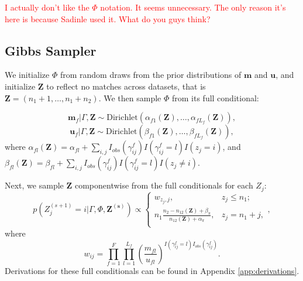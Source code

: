 \documentclass[ba]{imsart}
\begin{document}
\textcolor{red}{I actually don't like the $\Phi$ notation. It seems unnecessary. The only reason it's here is because Sadinle used it. What do you guys think?}

\hypertarget{posterior-sampling}{%
	\subsection{Gibbs Sampler}
	\label{gibbs_sampling}}

We initialize $\Phi$ from random draws from the prior distributions of $\bm{m}$ and $\bm{u}$, and initialize $\bm{Z}$ to reflect no matches across datasets, that is $\bm{Z} = (n_1 + 1, \ldots, n_1 + n_2)$. We then sample $\Phi$ from its full conditional:

$$\bm{m}_f|\Gamma, \bm{Z} \sim \text{Dirichlet}(\alpha_{f1}(\bm{Z}), \ldots, \alpha_{fL_f}(\bm{Z})),$$
$$\bm{u}_f|\Gamma, \bm{Z} \sim \text{Dirichlet}(\beta_{f1}(\bm{Z}), \ldots, \beta_{fL_f}(\bm{Z})),$$
where $\alpha_{fl}(\bm{Z})= \alpha_{fl} + \sum_{i,j} I_{obs}(\gamma_{ij}^f)I(\gamma_{ij}^f = l) I(z_j = i)$, and $\beta_{fl}(\bm{Z})= \beta_{fl} + \sum_{i,j} I_{obs}(\gamma_{ij}^f)I(\gamma_{ij}^f = l) I(z_j \neq i)$.

Next, we sample $\bm{Z}$ componentwise from the full conditionals for each $Z_j$:
$$p\left(Z_j^{(s+1)}  = i|\Gamma, \Phi, \bm{Z^{(s)}}\right) \propto
\begin{cases} 
	w_{z_j, j},  & z_j \leq n_1; \\
	n_1 \frac{n_2 - n_{12}(\bm{Z}) + \beta_{\pi}}{n_{12}(\bm{Z}) + \alpha_{\pi}}, & z_j  = n_1 + j, \\
\end{cases},$$
where 
$$w_{ij} = \prod_{f=1}^{F}\prod_{l = 1}^{L_f} \left(\frac{m_{fl}}{u_{fl}}\right)^{I(\gamma_{ij}^f = l)I_{obs}(\gamma_{ij}^f)}.$$
Derivations for these full conditionals can be found in Appendix \ref{app:derivations}.

%
\end{document}
